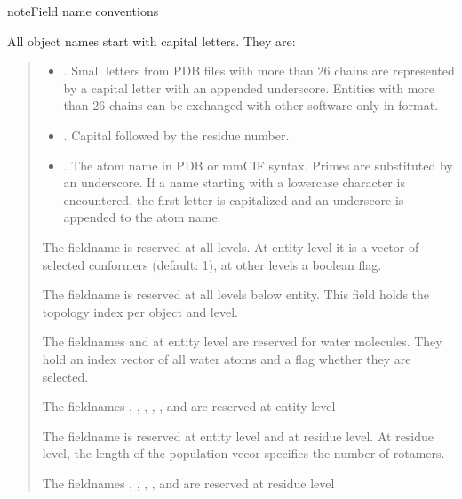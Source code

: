\documentclass[letterpaper,10pt,english]{sphinxmanual}
\begin{document}
\begin{sphinxadmonition}{note}{Field name conventions}

All object names start with capital letters. They are:
\begin{quote}
\begin{itemize}
\item {} 
. Small letters from PDB files with more than 26 chains are represented by a capital letter with an appended underscore.
Entities with more than 26 chains can be exchanged with other software only in  format.

\item {} 
. Capital  followed by the residue number.

\item {} 
. The atom name in PDB or mmCIF syntax. Primes are substituted by an underscore.
If a name starting with a lowercase character is encountered, the first letter is capitalized and an underscore is appended to the atom name.

\end{itemize}

The fieldname  is reserved at all levels. At entity level it is a vector of selected conformers (default: 1), at other levels a boolean flag.

The fieldname  is reserved at all levels below entity. This field holds the topology index per object and level.

The fieldnames  and  at entity level are reserved for water molecules. They hold an index vector of all water atoms and a flag whether they are selected.

The fieldnames , , , , , and  are reserved at entity level

The fieldname  is reserved at entity level and at residue level. At residue level, the length of the population vecor specifies the number of rotamers.

The fieldnames , , , , and  are reserved at residue level


\end{quote}
\end{sphinxadmonition}
\end{document}
